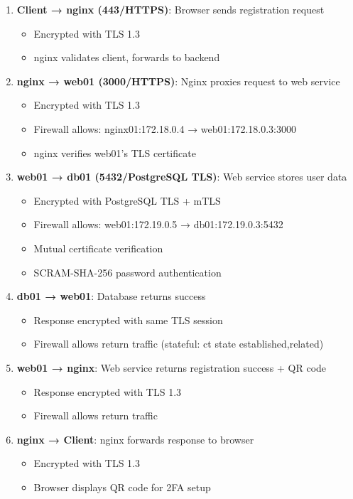 \begin{enumerate}
    \item \textbf{Client → nginx (443/HTTPS)}: Browser sends registration request
    \begin{itemize}
        \item Encrypted with TLS 1.3
        \item nginx validates client, forwards to backend
    \end{itemize}
    
    \item \textbf{nginx → web01 (3000/HTTPS)}: Nginx proxies request to web service
    \begin{itemize}
        \item Encrypted with TLS 1.3
        \item Firewall allows: nginx01:172.18.0.4 → web01:172.18.0.3:3000
        \item nginx verifies web01's TLS certificate
    \end{itemize}
    
    \item \textbf{web01 → db01 (5432/PostgreSQL TLS)}: Web service stores user data
    \begin{itemize}
        \item Encrypted with PostgreSQL TLS + mTLS
        \item Firewall allows: web01:172.19.0.5 → db01:172.19.0.3:5432
        \item Mutual certificate verification
        \item SCRAM-SHA-256 password authentication
    \end{itemize}
    
    \item \textbf{db01 → web01}: Database returns success
    \begin{itemize}
        \item Response encrypted with same TLS session
        \item Firewall allows return traffic (stateful: ct state established,related)
    \end{itemize}
    
    \item \textbf{web01 → nginx}: Web service returns registration success + QR code
    \begin{itemize}
        \item Response encrypted with TLS 1.3
        \item Firewall allows return traffic
    \end{itemize}
    
    \item \textbf{nginx → Client}: nginx forwards response to browser
    \begin{itemize}
        \item Encrypted with TLS 1.3
        \item Browser displays QR code for 2FA setup
    \end{itemize}
\end{enumerate}

